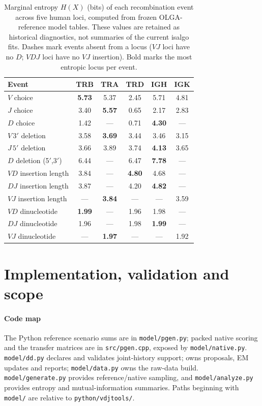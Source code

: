\documentclass[11pt]{article}
\theoremstyle{oldplain}
\theoremstyle{oldrem}
\begin{document}
\begin{table}[t]
  \centering
  \small
  \caption{Marginal entropy $H(X)$ (bits) of each recombination event across five human loci, computed
    from frozen OLGA-reference model tables. These values are retained as
    historical diagnostics, not summaries of the current isalgo fits. Dashes mark events absent from a locus ($VJ$ loci have no $D$; $VDJ$ loci have no $VJ$ insertion). Bold marks the most entropic locus per event.}
  \label{tab:entropy}
  \begin{tabular}{lccccc}
    \toprule
    Event & TRB & TRA & TRD & IGH & IGK \\
    \midrule
    $V$ choice            & \textbf{5.73} & 5.37 & 2.45 & 5.71 & 4.81 \\
    $J$ choice            & 3.40 & \textbf{5.57} & 0.65 & 2.17 & 2.83 \\
    $D$ choice             & 1.42 & --- & 0.71 & \textbf{4.30} & --- \\
    $V\,3'$ deletion      & 3.58 & \textbf{3.69} & 3.44 & 3.46 & 3.15 \\
    $J\,5'$ deletion      & 3.66 & 3.89 & 3.74 & \textbf{4.13} & 3.65 \\
    $D$ deletion (5$'$,3$'$) & 6.44 & --- & 6.47 & \textbf{7.78} & --- \\
    $VD$ insertion length & 3.84 & --- & \textbf{4.80} & 4.68 & --- \\
    $DJ$ insertion length & 3.87 & --- & 4.20 & \textbf{4.82} & --- \\
    $VJ$ insertion length & --- & \textbf{3.84} & --- & --- & 3.59 \\
    $VD$ dinucleotide     & \textbf{1.99} & --- & 1.96 & 1.98 & --- \\
    $DJ$ dinucleotide     & 1.96 & --- & 1.98 & \textbf{1.99} & --- \\
    $VJ$ dinucleotide     & --- & \textbf{1.97} & --- & --- & 1.92 \\
    \bottomrule
  \end{tabular}
\end{table}

\FloatBarrier
\section{Implementation, validation and scope}\label{sec:implementation}

\paragraph{Code map} The Python reference scenario sums are in
\texttt{model/pgen.py}; packed native scoring and the transfer matrices are in
\texttt{src/pgen.cpp}, exposed by \texttt{model/native.py}.
\texttt{model/dd.py} declares and validates joint-history support;
 owns proposals, EM updates and reports;
\texttt{model/data.py} owns the raw-data build.
\texttt{model/generate.py} provides reference/native sampling, and
\texttt{model/analyze.py} provides entropy and mutual-information summaries.
Paths beginning with \texttt{model/} are relative to \texttt{python/vdjtools/}.
\end{document}

